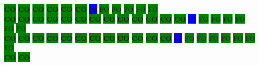 \colorbox{green}{\color[rgb]{0,0,0}\textbf{CO}}%
\colorbox{green}{\color[rgb]{0,0,0}\textbf{CO}}%
\colorbox{green}{\color[rgb]{0,0,0}\textbf{CO}}%
\colorbox{green}{\color[rgb]{0,0,0}\textbf{CO}}%
\colorbox{green}{\color[rgb]{0,0,0}\textbf{CO}}%
\colorbox{green}{\color[rgb]{0,0,0}\textbf{CO}}%
\colorbox{blue}{\color[rgb]{1,0,0}\textbf{09}}%
\colorbox{green}{\color[gray]{0.75}FO}%
\colorbox{green}{\color[gray]{0.75}FO}%
\colorbox{green}{\color[gray]{0.75}FO}%
\colorbox{green}{\color[gray]{0.75}FO}%
\colorbox{green}{\color[gray]{0.75}FO}%
\\
\colorbox{green}{\color[rgb]{0,0,0}\textbf{CO}}%
\colorbox{green}{\color[rgb]{0,0,0}\textbf{CO}}%
\colorbox{green}{\color[rgb]{0,0,0}\textbf{CO}}%
\colorbox{green}{\color[rgb]{0,0,0}\textbf{CO}}%
\colorbox{green}{\color[rgb]{0,0,0}\textbf{CO}}%
\colorbox{green}{\color[rgb]{0,0,0}\textbf{CO}}%
\colorbox{green}{\color[rgb]{0,0,0}\textbf{CO}}%
\colorbox{green}{\color[rgb]{0,0,0}\textbf{CO}}%
\colorbox{green}{\color[rgb]{0,0,0}\textbf{CO}}%
\colorbox{green}{\color[rgb]{0,0,0}\textbf{CO}}%
\colorbox{green}{\color[rgb]{0,0,0}\textbf{CO}}%
\colorbox{green}{\color[rgb]{0,0,0}\textbf{CO}}%
\colorbox{green}{\color[rgb]{0,0,0}\textbf{CO}}%
\colorbox{blue}{\color[rgb]{1,0,0}\textbf{07}}%
\colorbox{green}{\color[gray]{0.75}FO}%
\colorbox{green}{\color[gray]{0.75}FO}%
\colorbox{green}{\color[gray]{0.75}FO}%
\colorbox{green}{\color[gray]{0.75}FO}%
\colorbox{green}{\color[gray]{0.75}FO}%
\colorbox{green}{\color[gray]{0.75}FO}%
\\
\colorbox{green}{\color[rgb]{0,0,0}\textbf{CO}}%
\colorbox{green}{\color[rgb]{0,0,0}\textbf{CO}}%
\colorbox{green}{\color[rgb]{0,0,0}\textbf{CO}}%
\colorbox{green}{\color[rgb]{0,0,0}\textbf{CO}}%
\colorbox{green}{\color[rgb]{0,0,0}\textbf{CO}}%
\colorbox{green}{\color[rgb]{0,0,0}\textbf{CO}}%
\colorbox{green}{\color[rgb]{0,0,0}\textbf{CO}}%
\colorbox{green}{\color[rgb]{0,0,0}\textbf{CO}}%
\colorbox{green}{\color[rgb]{0,0,0}\textbf{CO}}%
\colorbox{green}{\color[rgb]{0,0,0}\textbf{CO}}%
\colorbox{green}{\color[rgb]{0,0,0}\textbf{CO}}%
\colorbox{green}{\color[rgb]{0,0,0}\textbf{CO}}%
\colorbox{blue}{\color[rgb]{1,0,0}\textbf{05}}%
\colorbox{green}{\color[gray]{0.75}FO}%
\colorbox{green}{\color[gray]{0.75}FO}%
\colorbox{green}{\color[gray]{0.75}FO}%
\colorbox{green}{\color[gray]{0.75}FO}%
\colorbox{green}{\color[gray]{0.75}FO}%
\colorbox{green}{\color[gray]{0.75}FO}%
\colorbox{green}{\color[gray]{0.75}FO}%
\\
\colorbox{green}{\color[rgb]{0,0,0}\textbf{CO}}%
\colorbox{green}{\color[rgb]{0,0,0}\textbf{CO}}%
